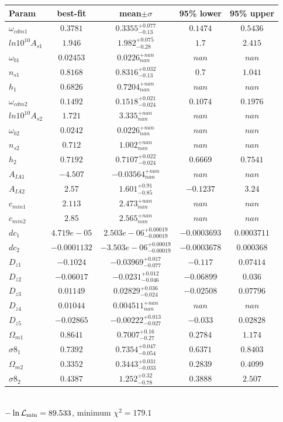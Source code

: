 \begin{tabular}{|l|c|c|c|c|} 
 \hline 
Param & best-fit & mean$\pm\sigma$ & 95\% lower & 95\% upper \\ \hline 
$\omega_{cdm 1 }$ &$0.3781$ & $0.3355_{-0.13}^{+0.077}$ & $0.1474$ & $0.5436$ \\ 
$ln10^{10}A_{s 1 }$ &$1.946$ & $1.982_{-0.28}^{+0.075}$ & $1.7$ & $2.415$ \\ 
$\omega_{b 1 }$ &$0.02453$ & $0.0226_{nan}^{+nan}$ & $nan$ & $nan$ \\ 
$n_{s 1 }$ &$0.8168$ & $0.8316_{-0.13}^{+0.032}$ & $0.7$ & $1.041$ \\ 
$h_{1 }$ &$0.6826$ & $0.7204_{nan}^{+nan}$ & $nan$ & $nan$ \\ 
$\omega_{cdm 2 }$ &$0.1492$ & $0.1518_{-0.024}^{+0.021}$ & $0.1074$ & $0.1976$ \\ 
$ln10^{10}A_{s 2 }$ &$1.721$ & $3.335_{nan}^{+nan}$ & $nan$ & $nan$ \\ 
$\omega_{b 2 }$ &$0.0242$ & $0.0226_{nan}^{+nan}$ & $nan$ & $nan$ \\ 
$n_{s 2 }$ &$0.712$ & $1.002_{nan}^{+nan}$ & $nan$ & $nan$ \\ 
$h_{2 }$ &$0.7192$ & $0.7107_{-0.024}^{+0.022}$ & $0.6669$ & $0.7541$ \\ 
$A_{IA 1 }$ &$-4.507$ & $-0.03564_{nan}^{+nan}$ & $nan$ & $nan$ \\ 
$A_{IA 2 }$ &$2.57$ & $1.601_{-0.85}^{+0.91}$ & $-0.1237$ & $3.24$ \\ 
$c_{min 1 }$ &$2.113$ & $2.473_{nan}^{+nan}$ & $nan$ & $nan$ \\ 
$c_{min 2 }$ &$2.85$ & $2.565_{nan}^{+nan}$ & $nan$ & $nan$ \\ 
$dc_{1 }$ &$4.719e-05$ & $2.503e-06_{-0.00019}^{+0.00019}$ & $-0.0003693$ & $0.0003711$ \\ 
$dc_{2 }$ &$-0.0001132$ & $-3.503e-06_{-0.00019}^{+0.00019}$ & $-0.0003678$ & $0.000368$ \\ 
$D_{z1 }$ &$-0.1024$ & $-0.03969_{-0.077}^{+0.017}$ & $-0.117$ & $0.07414$ \\ 
$D_{z2 }$ &$-0.06017$ & $-0.0231_{-0.046}^{+0.012}$ & $-0.06899$ & $0.036$ \\ 
$D_{z3 }$ &$0.01149$ & $0.02829_{-0.024}^{+0.036}$ & $-0.02508$ & $0.07796$ \\ 
$D_{z4 }$ &$0.01044$ & $0.004511_{nan}^{+nan}$ & $nan$ & $nan$ \\ 
$D_{z5 }$ &$-0.02865$ & $-0.00222_{-0.027}^{+0.013}$ & $-0.033$ & $0.02828$ \\ 
$\Omega_{m 1 }$ &$0.8641$ & $0.7007_{-0.27}^{+0.16}$ & $0.2784$ & $1.174$ \\ 
$\sigma8_{1 }$ &$0.7392$ & $0.7354_{-0.054}^{+0.047}$ & $0.6371$ & $0.8403$ \\ 
$\Omega_{m 2 }$ &$0.3352$ & $0.3443_{-0.033}^{+0.031}$ & $0.2839$ & $0.4099$ \\ 
$\sigma8_{2 }$ &$0.4387$ & $1.252_{-0.78}^{+0.32}$ & $0.3888$ & $2.507$ \\ 
\hline 
 \end{tabular} \\ 
$-\ln{\cal L}_\mathrm{min} =89.533$, minimum $\chi^2=179.1$ \\ 
